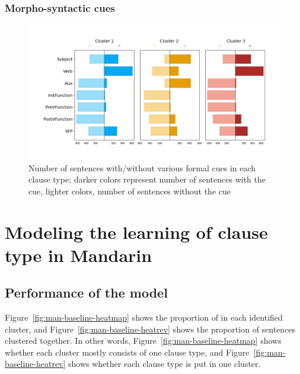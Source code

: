 \subsubsection{Morpho-syntactic cues}
\label{sec:mancl:corpus:results:syn}


\begin{figure}[H]
    \centering
    \includegraphics[width=1\textwidth]{figures/man-baseline-conservative-syncluster.jpg}
    \caption{Number of sentences with/without various formal cues in each clause type; darker colors represent number of sentences with the cue, lighter colors, number of sentences without the cue }
    \label{fig:man-real-syncluster}
\end{figure}




\section{Modeling the learning of clause type in 
Mandarin}
\label{sec:mancl:model}


\subsection{Performance of the \dlearnerabbr{} model}
\label{sec:mancl:model:results:d}

Figure~\ref{fig:man-baseline-heatmap} shows the proportion of \diis{} in each identified cluster, and Figure~\ref{fig:man-baseline-heatrev} shows the proportion of sentences clustered together. In other words, Figure~\ref{fig:man-baseline-heatmap} shows whether each cluster mostly consists of one clause type, and Figure~\ref{fig:man-baseline-heatrev} shows whether each clause type is put in one cluster.  



